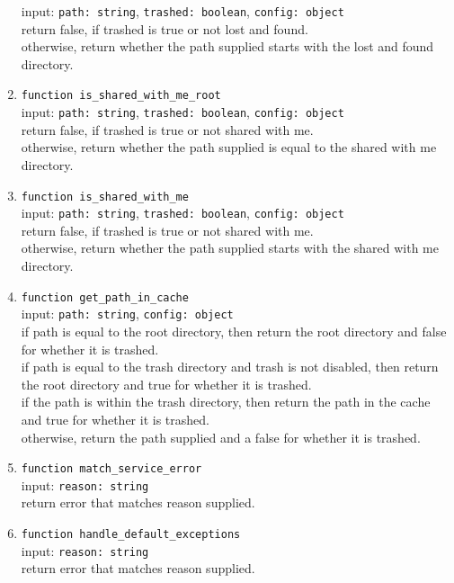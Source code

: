 \begin{enumerate}
    input: \verb|path: string|, \verb|trashed: boolean|, \verb|config: object| \\
    return false, if trashed is true or not lost and found.\\
    otherwise, return whether the path supplied starts with the lost and found directory.
    \item \verb|function is_shared_with_me_root| \\
    input: \verb|path: string|, \verb|trashed: boolean|, \verb|config: object| \\
    return false, if trashed is true or not shared with me.\\
    otherwise, return whether the path supplied is equal to the shared with me directory.
    \item \verb|function is_shared_with_me| \\
    input: \verb|path: string|, \verb|trashed: boolean|, \verb|config: object| \\
    return false, if trashed is true or not shared with me.\\
    otherwise, return whether the path supplied starts with the shared with me directory.
    \item \verb|function get_path_in_cache| \\
    input: \verb|path: string|, \verb|config: object| \\
    if path is equal to the root directory, then return the root directory and false for whether it is trashed. \\
    if path is equal to the trash directory and trash is not disabled, then return the root directory and true for whether it is trashed. \\
    if the path is within the trash directory, then return the path in the cache and true for whether it is trashed.\\
    otherwise, return the path supplied and a false for whether it is trashed.
    \item \verb|function match_service_error| \\
    input: \verb|reason: string| \\
    return error that matches reason supplied.
    \item \verb|function handle_default_exceptions| \\
    input: \verb|reason: string| \\
    return error that matches reason supplied.
    
    
\end{enumerate}
